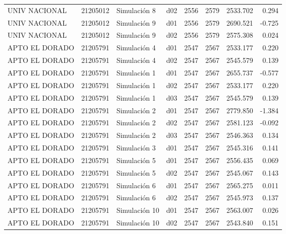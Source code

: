 \begin{landscape}
\begin{longtable}{lrlp{2cm}p{2cm}p{3cm}p{2cm}r}
           UNIV NACIONAL &  21205012 &   Simulación 8 &   d02 &      2556 &     2579 &  2533.702 &     0.294 \\
           UNIV NACIONAL &  21205012 &   Simulación 9 &   d01 &      2556 &     2579 &  2690.521 &    -0.725 \\
           UNIV NACIONAL &  21205012 &   Simulación 9 &   d02 &      2556 &     2579 &  2575.308 &     0.024 \\
          APTO EL DORADO &  21205791 &   Simulación 4 &   d01 &      2547 &     2567 &  2533.177 &     0.220 \\
          APTO EL DORADO &  21205791 &   Simulación 4 &   d02 &      2547 &     2567 &  2545.579 &     0.139 \\
          APTO EL DORADO &  21205791 &   Simulación 1 &   d01 &      2547 &     2567 &  2655.737 &    -0.577 \\
          APTO EL DORADO &  21205791 &   Simulación 1 &   d02 &      2547 &     2567 &  2533.177 &     0.220 \\
          APTO EL DORADO &  21205791 &   Simulación 1 &   d03 &      2547 &     2567 &  2545.579 &     0.139 \\
          APTO EL DORADO &  21205791 &   Simulación 2 &   d01 &      2547 &     2567 &  2779.850 &    -1.384 \\
          APTO EL DORADO &  21205791 &   Simulación 2 &   d02 &      2547 &     2567 &  2581.123 &    -0.092 \\
          APTO EL DORADO &  21205791 &   Simulación 2 &   d03 &      2547 &     2567 &  2546.363 &     0.134 \\
          APTO EL DORADO &  21205791 &   Simulación 3 &   d01 &      2547 &     2567 &  2545.316 &     0.141 \\
          APTO EL DORADO &  21205791 &   Simulación 5 &   d01 &      2547 &     2567 &  2556.435 &     0.069 \\
          APTO EL DORADO &  21205791 &   Simulación 5 &   d02 &      2547 &     2567 &  2545.067 &     0.143 \\
          APTO EL DORADO &  21205791 &   Simulación 6 &   d01 &      2547 &     2567 &  2565.275 &     0.011 \\
          APTO EL DORADO &  21205791 &   Simulación 6 &   d02 &      2547 &     2567 &  2545.973 &     0.137 \\
          APTO EL DORADO &  21205791 &  Simulación 10 &   d01 &      2547 &     2567 &  2563.007 &     0.026 \\
          APTO EL DORADO &  21205791 &  Simulación 10 &   d02 &      2547 &     2567 &  2543.840 &     0.151 \\

\end{longtable}
\end{landscape}
